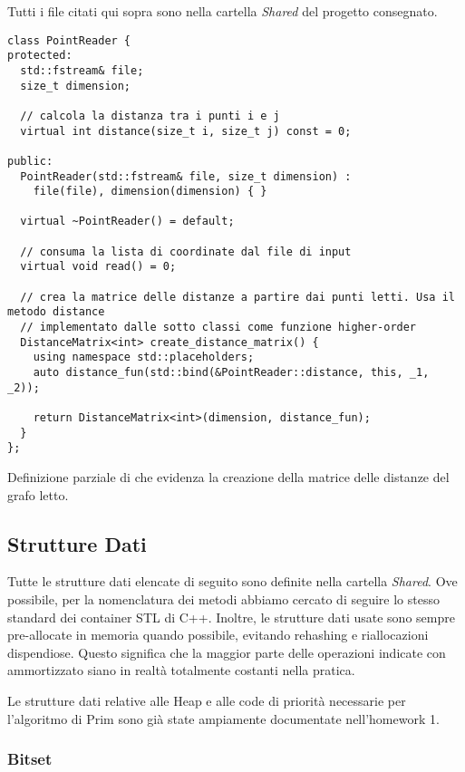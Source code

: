 Tutti i file citati qui sopra sono nella cartella \textit{Shared} del progetto consegnato.

\begin{listing}[!ht]
\begin{verbatim}
class PointReader {
protected:
  std::fstream& file;
  size_t dimension;

  // calcola la distanza tra i punti i e j
  virtual int distance(size_t i, size_t j) const = 0;

public:
  PointReader(std::fstream& file, size_t dimension) :
    file(file), dimension(dimension) { }

  virtual ~PointReader() = default;

  // consuma la lista di coordinate dal file di input
  virtual void read() = 0;
    
  // crea la matrice delle distanze a partire dai punti letti. Usa il metodo distance 
  // implementato dalle sotto classi come funzione higher-order
  DistanceMatrix<int> create_distance_matrix() {
    using namespace std::placeholders;
    auto distance_fun(std::bind(&PointReader::distance, this, _1, _2));

    return DistanceMatrix<int>(dimension, distance_fun);
  }
};
\end{verbatim}
\caption{Definizione parziale di  che evidenza la creazione della matrice delle distanze del grafo letto.}
\label{listing:point-reader}
\end{listing}

\subsection{Strutture Dati}

Tutte le strutture dati elencate di seguito sono definite nella cartella \textit{Shared}.
Ove possibile, per la nomenclatura dei metodi abbiamo cercato di seguire lo stesso standard dei container STL di C++.
Inoltre, le strutture dati usate sono sempre pre-allocate in memoria quando possibile, evitando rehashing e riallocazioni dispendiose. Questo significa che la maggior parte delle operazioni indicate con \complexityConstant{} ammortizzato siano in realtà totalmente costanti nella pratica.

\noindent Le strutture dati relative alle Heap e alle code di priorità necessarie per l'algoritmo di Prim sono già state ampiamente documentate nell'homework 1.

\subsubsection{Bitset}

